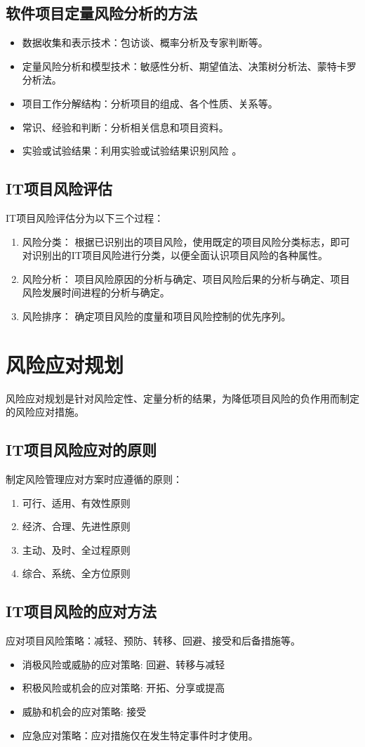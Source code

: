 \subsection{软件项目定量风险分析的方法}
\begin{itemize}
	\item 数据收集和表示技术：包访谈、概率分析及专家判断等。
	\item 定量风险分析和模型技术：敏感性分析、期望值法、决策树分析法、蒙特卡罗分析法。
	\item 项目工作分解结构：分析项目的组成、各个性质、关系等。
	\item 常识、经验和判断：分析相关信息和项目资料。
	\item 实验或试验结果：利用实验或试验结果识别风险 。
\end{itemize}
\subsection{IT项目风险评估}
IT项目风险评估分为以下三个过程：
\begin{enumerate}
	\item 风险分类： 根据已识别出的项目风险，使用既定的项目风险分类标志，即可对识别出的IT项目风险进行分类，以便全面认识项目风险的各种属性。 
	\item 风险分析： 项目风险原因的分析与确定、项目风险后果的分析与确定、项目风险发展时间进程的分析与确定。
	\item 风险排序： 确定项目风险的度量和项目风险控制的优先序列。
\end{enumerate}
\section{风险应对规划}
风险应对规划是针对风险定性、定量分析的结果，为降低项目风险的负作用而制定的风险应对措施。
\subsection{IT项目风险应对的原则}
\par 制定风险管理应对方案时应遵循的原则：
\begin{enumerate}
	\item 可行、适用、有效性原则
	\item 经济、合理、先进性原则
	\item 主动、及时、全过程原则
	\item 综合、系统、全方位原则
\end{enumerate}
\subsection{IT项目风险的应对方法}
应对项目风险策略：减轻、预防、转移、回避、接受和后备措施等。 
\begin{itemize}
	\item 消极风险或威胁的应对策略: 回避、转移与减轻
	\item 积极风险或机会的应对策略: 开拓、分享或提高 
	\item 威胁和机会的应对策略: 接受
	\item 应急应对策略：应对措施仅在发生特定事件时才使用。 
\end{itemize}

